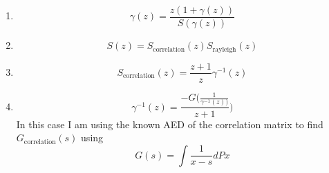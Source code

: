 \documentclass[12pt,a4paper]{report}
\begin{document}
\begin{itemize}
\begin{enumerate}
\item 
	\begin{equation}
	\gamma(z) =  \frac{z(1+\gamma(z))}{S(\gamma(z))}
	\end{equation}
\item 
	\begin{equation}
	S(z) = S_{\text{correlation}}(z) S_{\text{rayleigh}}(z)
	\end{equation}
	
	\item 
	\begin{equation}\label{S_Stieltjes}
	S_{\text{correlation}}(z)  = \frac{z+1}{z} \gamma^{-1}(z)
	\end{equation}

\item 
	\begin{equation}
	\gamma^{-1}(z) = \frac{-G(\frac{1}{\gamma^{-1}(z))}}{z+1})
	\end{equation}
	In this case I am using the known AED of the correlation matrix to find $G_{\text{correlation}}(s)$ using
	\begin{equation}
	G(s) = \int \frac{1}{x-s} dPx
	\end{equation}
	
\end{enumerate}
\end{itemize}
\end{document}
